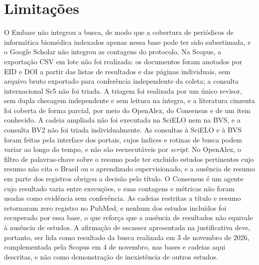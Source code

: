 \section{Limitações}

O Embase não integrou a busca, de modo que a cobertura de periódicos de informática biomédica indexados apenas nessa base pode ter sido subestimada, e o Google Scholar não integrou as contagens do protocolo. Na Scopus, a exportação CSV em lote não foi realizada: os documentos foram anotados por EID e DOI a partir das listas de resultados e das páginas individuais, sem arquivo bruto exportado para conferência independente da coleta; a consulta internacional Sc5 não foi triada. A triagem foi realizada por um único revisor, sem dupla checagem independente e sem leitura na íntegra, e a literatura cinzenta foi coberta de forma parcial, por meio do OpenAlex, do Consensus e de um item conhecido. A cadeia ampliada não foi executada na SciELO nem na BVS, e a consulta BV2 não foi triada individualmente. As consultas à SciELO e à BVS foram feitas pela interface dos portais, cujos índices e rotinas de busca podem variar ao longo do tempo, e não são reexecutáveis por \textit{script}. No OpenAlex, o filtro de palavras-chave sobre o resumo pode ter excluído estudos pertinentes cujo resumo não cita o Brasil ou o aprendizado supervisionado, e a ausência de resumo em parte dos registros obrigou a decisão pelo título. O Consensus é um agente cujo resultado varia entre execuções, e suas contagens e métricas não foram usadas como evidência sem conferência. As cadeias restritas a título e resumo retornaram zero registro no PubMed, e nenhum dos estudos incluídos foi recuperado por essa base, o que reforça que a ausência de resultados não equivale à ausência de estudos. A afirmação de escassez apresentada na justificativa deve, portanto, ser lida como resultado da busca realizada em 3 de novembro de 2026, complementada pela Scopus em 4 de novembro, nas bases e cadeias aqui descritas, e não como demonstração de inexistência de outros estudos.

